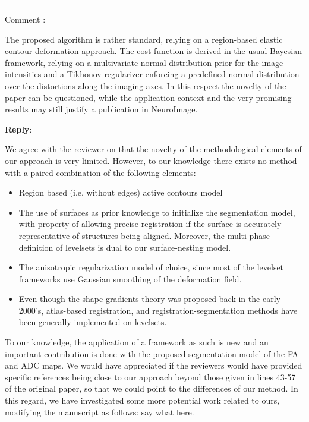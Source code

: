 \documentclass[9pt]{memoir}
\newcounter{reviewpoint}
\newenvironment{reviewpoint}%
{\refstepcounter{reviewpoint}\par\medskip\vspace{3ex}\hrule\vspace{1.5ex}\par\noindent%
   {\fontseries{b}\selectfont Comment \arabic{reviewpoint}:}
   \begingroup%
   \color{black!60}
   \fontshape{it}\selectfont %

}
{\endgroup\label{com:\thereviewpoint}\par\medskip}
\newcommand{\reply}{\par\fontshape{n}\selectfont \noindent \textbf{Reply}:\ }
\begin{document}
\begin{reviewpoint}
The proposed algorithm is rather standard, relying on a region-based elastic contour deformation approach.
The cost function is derived in the usual Bayesian framework, relying on a multivariate normal distribution prior for the image
  intensities and a Tikhonov regularizer enforcing a predefined normal distribution over the distortions along the imaging axes.
In this respect the novelty of the paper can be questioned, while the application context and the very promising results may still
  justify a publication in NeuroImage.
\end{reviewpoint}
\reply{
We agree with the reviewer on that the novelty of the methodological elements of our approach is very limited.
However, to our knowledge there exists no method with a paired combination of the following elements:
\begin{itemize}
\item Region based (i.e. without edges) active contours model
\item The use of surfaces as prior knowledge to initialize the segmentation model,
  with property of allowing precise registration if the surface is accurately representative
  of structures being aligned.
  Moreover, the multi-phase definition of levelsets is dual to our surface-nesting model.
\item The anisotropic regularization model of choice, since most of the levelset frameworks
  use Gaussian smoothing of the deformation field.
\item Even though the shape-gradients theory was proposed back in the early 2000's, atlas-based
  registration, and registration-segmentation methods have been generally implemented on levelsets.
\end{itemize}
To our knowledge, the application of a framework as such is new and an important contribution is done
  with the proposed segmentation model of the FA and ADC maps.
We would have appreciated if the reviewers would have provided specific references being close to our approach
  beyond those given in lines 43-57 of the original paper, so that we could point to the differences of our
  method.
In this regard, we have investigated some more potential work related to ours, modifying the manuscript as
  follows: {\color{red} say what here}.
}
\end{document}
